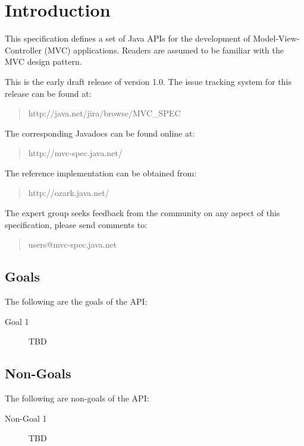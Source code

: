 \chapter{Introduction}

This specification defines a set of Java APIs for the development of Model-View-Controller (MVC) applications.
Readers are assumed to be familiar with the MVC design pattern.

This is the early draft release of version 1.0. The issue tracking system for this release can be found at:

\begin{quote}
http://java.net/jira/browse/MVC\_SPEC
\end{quote}

The corresponding Javadocs can be found online at:

\begin{quote}
http://mvc-spec.java.net/
\end{quote}

The reference implementation can be obtained from:

\begin{quote}
http://ozark.java.net/
\end{quote}

The expert group seeks feedback from the community on any aspect of this specification, please send comments to:

\begin{quote}
users@mvc-spec.java.net
\end{quote}

\section{Goals}

The following are the goals of the API:

\begin{description}

\item[Goal 1] TBD

\end{description}

\section{Non-Goals}
\label{non_goals}

The following are non-goals of the API:

\begin{description}

\item[Non-Goal 1] TBD

\end{description}

